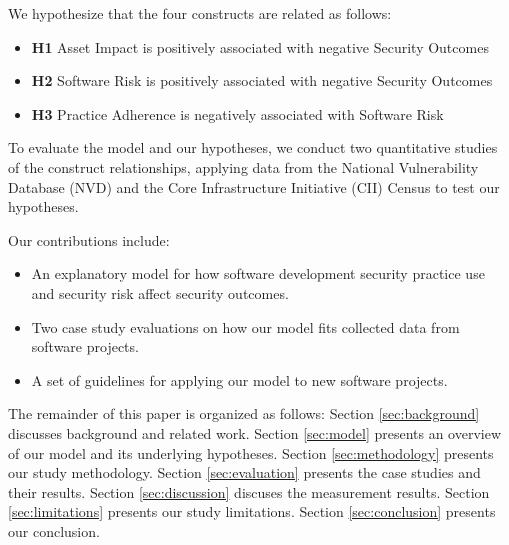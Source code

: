 We hypothesize that the four constructs are related as follows:
\begin{itemize}
	\item \textbf{H1} Asset Impact is positively associated with negative Security Outcomes
	\item \textbf{H2} Software Risk is positively associated with negative Security Outcomes
	\item \textbf{H3} Practice Adherence is negatively associated with Software Risk 	
\end{itemize}
	
To evaluate the model and our hypotheses, we conduct two quantitative studies of the construct relationships, applying data from the National Vulnerability Database (NVD) and the Core Infrastructure Initiative (CII) Census to test our hypotheses.
  
Our contributions include:
\begin{itemize}
\item An explanatory model for how software development security practice use and security risk affect security outcomes.
\item Two case study evaluations on how our model fits collected data from software projects.
\item A set of guidelines for applying our model to new software projects. 
\end{itemize}
The remainder of this paper is organized as follows:  Section \ref{sec:background} discusses background and related work. Section \ref{sec:model} presents an overview of our model and its underlying hypotheses. Section \ref{sec:methodology} presents our study methodology. Section \ref{sec:evaluation} presents the case studies and their results. Section \ref{sec:discussion} discuses the measurement results. Section \ref{sec:limitations} presents our study limitations. Section \ref{sec:conclusion} presents our conclusion.
